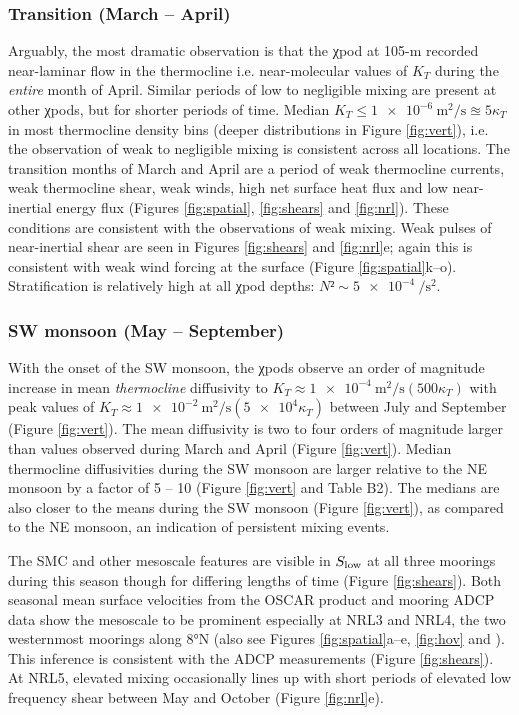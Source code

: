 \documentclass[onecol]{ametsoc}
\begin{document}
\subsubsection*{Transition (March -- April)}
\label{sec:org10f739a}

Arguably, the most dramatic observation is that the χpod at 105-m recorded near-laminar flow in the thermocline i.e. near-molecular values of \(K_T\) during the \emph{entire} month of April.
Similar periods of low to negligible mixing are present at other χpods, but for shorter periods of time.
Median \(K_T ≤ \SI{1e-6}{\m\squared\per\s} \approxeq 5κ_T\) in most thermocline density bins (deeper distributions in Figure \ref{fig:vert}), i.e. the observation of weak to negligible mixing is consistent across all locations.
The transition months of March and April are a period of weak thermocline currents, weak thermocline shear, weak winds, high net surface heat flux and low near-inertial energy flux (Figures \ref{fig:spatial}, \ref{fig:shears} and \ref{fig:nrl}). These conditions are consistent with the observations of weak mixing.
Weak pulses of near-inertial shear are seen in Figures \ref{fig:shears} and \ref{fig:nrl}e; again this is consistent with weak wind forcing at the surface (Figure \ref{fig:spatial}k--o).
Stratification is relatively high at all χpod depths: $N² \sim \SI{5e-4}{\per\second\squared}$.

\subsubsection*{SW monsoon (May -- September)}
\label{sec:orgec06087}

With the onset of the SW monsoon, the χpods observe an order of magnitude increase in mean \emph{thermocline} diffusivity to \(K_T \approx \SI{1e-4}{\m\squared\per\s} (500κ_T)\) with peak values of \(K_T \approx \SI{1e-2}{\m\squared\per\s} (\num{5e4}κ_T)\) between July and September (Figure \ref{fig:vert}).
The mean diffusivity is two to four orders of magnitude larger than values observed during March and April (Figure \ref{fig:vert}).
Median thermocline diffusivities during the SW monsoon are larger relative to the NE monsoon by a factor of 5 -- 10 (Figure \ref{fig:vert} and Table B2).
The medians are also closer to the means during the SW monsoon (Figure \ref{fig:vert}), as compared to the NE monsoon, an indication of persistent mixing events.

The SMC and other mesoscale features are visible in \(S_\text{low}\) at all three moorings during this season though for differing lengths of time (Figure \ref{fig:shears}).
Both seasonal mean surface velocities from the OSCAR product and mooring ADCP data show the mesoscale to be prominent especially at NRL3 and NRL4, the two westernmost moorings along 8°N (also see Figures \ref{fig:spatial}a--e, \ref{fig:hov} and \citealp{Wijesekera2016a}).
This inference is consistent with the ADCP measurements (Figure \ref{fig:shears}). At NRL5, elevated mixing occasionally lines up with short periods of elevated low frequency shear between May and October (Figure \ref{fig:nrl}e).
\end{document}
